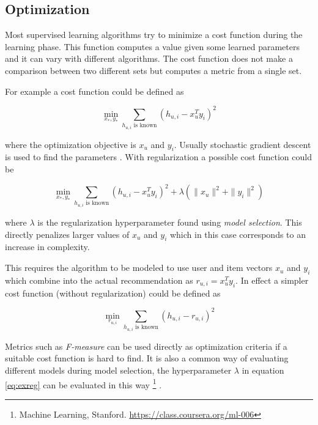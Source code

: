 
\subsection{Optimization}\label{sec:background:theory:opt}

Most supervised learning algorithms try to minimize a cost function during the learning phase. This function computes a value given some learned parameters and it can vary with different algorithms. The cost function does not make a comparison between two different sets but computes a metric from a single set.

For example a cost function could be defined as

\begin{equation}
    \min_{x_*, y_*} \sum_{h_{u,i} \text{ is known} } (h_{u, i} - x_{u}^T y_i)^2
\end{equation}

where the optimization objective is $x_u$ and $y_i$. Usually stochastic gradient descent is used to find the parameters \cite{hu2008collaborative}. With regularization a possible cost function could be

\begin{equation}\label{eq:exreg}
    \min_{x_*, y_*} \sum_{h_{u,i} \text{ is known} } (h_{u, i} - x_{u}^T y_i)^2 + \lambda(\|x_u\|^2 + \|y_i\|^2)
\end{equation}

where $\lambda$ is the regularization hyperparameter found using \textit{model selection}. This directly penalizes larger values of $x_u$ and $y_i$ which in this case corresponds to an increase in complexity.

This requires the algorithm to be modeled to use user and item vectors $x_u$ and $y_i$ which combine into the actual recommendation as $r_{u, i} = x_u^T y_i$. In effect a simpler cost function (without regularization) could be defined as

\begin{equation}
    \min_{r_{u, i}} \sum_{h_{u,i} \text{ is known} } (h_{u, i} - r_{u, i})^2
\end{equation}

Metrics such as \textit{F-measure} can be used directly as optimization criteria if a suitable cost function is hard to find. It is also a common way of evaluating different models during model selection, the hyperparameter $\lambda$ in equation \eqref{eq:exreg} can be evaluated in this way
\footnote{Machine Learning, Stanford. \url{https://class.coursera.org/ml-006}}
.

